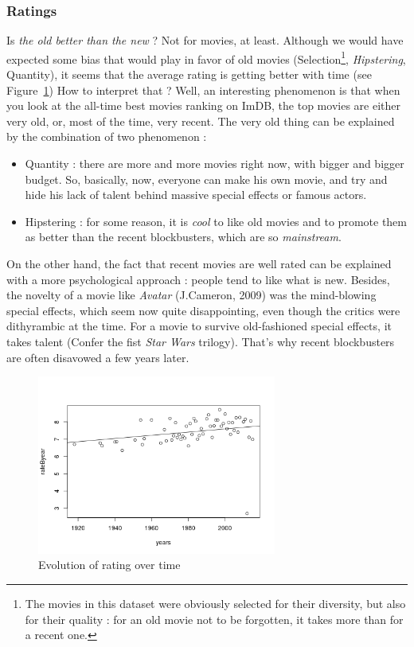 \subsubsection{Ratings}
\label{subs:Ratings}

Is \textit{the old better than the new} ? Not for movies, at least.
Although we would have expected some bias that would play in favor of old movies (Selection\footnote{The movies in this dataset were obviously selected for their diversity, but also for their quality : for an old movie not to be forgotten, it takes more than for a recent one.},
 \textit{Hipstering}, Quantity), it seems that the average rating is getting better with time (see Figure~\ref{fig:ratingEvolution})
How to interpret that ? Well, an interesting phenomenon is that when you look at the all-time best movies ranking on ImDB, the top movies are either very old, or, most of the time, very recent.
The very old thing can be explained by the combination of two phenomenon :
\begin{itemize}
    \item Quantity : there are more and more movies right now, with bigger and bigger budget.
    So, basically, now, everyone can make his own movie, and try and hide his lack of talent behind massive special effects or famous actors.
    \item Hipstering : for some reason, it is \textit{cool} to like old movies and to promote them as better than the recent blockbusters, which are so \textit{mainstream}.
\end{itemize}
On the other hand, the fact that recent movies are well rated can be explained with a more psychological approach : people tend to like what is new.
Besides, the novelty of a movie like \textit{Avatar} (J.Cameron, 2009) was the mind-blowing special effects, which seem now quite disappointing, even though the critics were dithyrambic at the time.
For a movie to survive old-fashioned special effects, it takes talent (Confer the fist \textit{Star Wars} trilogy).
That's why recent blockbusters are often disavowed a few years later.

\begin{figure}[!h]
\begin{center}
\includegraphics[width=0.70\textwidth]{../src/pre-processing/stats/results/ratingEvolution.png}
\end{center}
\caption{Evolution of rating over time}
\label{fig:ratingEvolution}
\end{figure}

